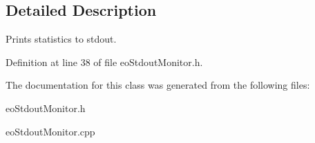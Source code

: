 \subsection{Detailed Description}
Prints statistics to stdout. 



Definition at line 38 of file eo\-Stdout\-Monitor.h.

The documentation for this class was generated from the following files:\begin{CompactItemize}
\item 
eo\-Stdout\-Monitor.h\item 
eo\-Stdout\-Monitor.cpp\end{CompactItemize}
